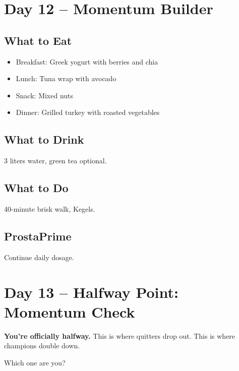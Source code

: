 \documentclass[11pt,oneside]{book}
\begin{document}
\clearpage


\chapter*{Day 12 – Momentum Builder}

\section*{What to Eat}
\begin{itemize}[leftmargin=*]
\item Breakfast: Greek yogurt with berries and chia
\item Lunch: Tuna wrap with avocado
\item Snack: Mixed nuts
\item Dinner: Grilled turkey with roasted vegetables
\end{itemize}

\section*{What to Drink}
3 liters water, green tea optional.

\section*{What to Do}
40-minute brisk walk, Kegels.

\section*{ProstaPrime}
Continue daily dosage.

\clearpage

\chapter*{Day 13 – Halfway Point: Momentum Check}

\textbf{You're officially halfway.} This is where quitters drop out. This is where champions double down.

Which one are you?
\end{document}
